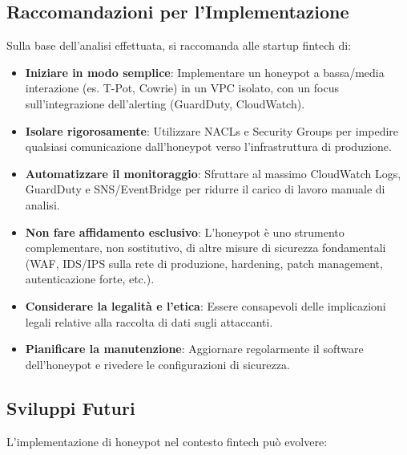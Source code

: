 \subsection{Raccomandazioni per l'Implementazione}
\label{subsec:raccomandazioni}

Sulla base dell'analisi effettuata, si raccomanda alle startup fintech di:

\begin{itemize}
    \item \textbf{Iniziare in modo semplice}: Implementare un honeypot a bassa/media interazione (es. T-Pot, Cowrie) in un VPC isolato, con un focus sull'integrazione dell'alerting (GuardDuty, CloudWatch).
    \item \textbf{Isolare rigorosamente}: Utilizzare NACLs e Security Groups per impedire qualsiasi comunicazione dall'honeypot verso l'infrastruttura di produzione.
    \item \textbf{Automatizzare il monitoraggio}: Sfruttare al massimo CloudWatch Logs, GuardDuty e SNS/EventBridge per ridurre il carico di lavoro manuale di analisi.
    \item \textbf{Non fare affidamento esclusivo}: L'honeypot è uno strumento complementare, non sostitutivo, di altre misure di sicurezza fondamentali (WAF, IDS/IPS sulla rete di produzione, hardening, patch management, autenticazione forte, etc.).
    \item \textbf{Considerare la legalità e l'etica}: Essere consapevoli delle implicazioni legali relative alla raccolta di dati sugli attaccanti.
    \item \textbf{Pianificare la manutenzione}: Aggiornare regolarmente il software dell'honeypot e rivedere le configurazioni di sicurezza.
\end{itemize}

\subsection{Sviluppi Futuri}
\label{subsec:sviluppi_futuri}

L'implementazione di honeypot nel contesto fintech può evolvere:

